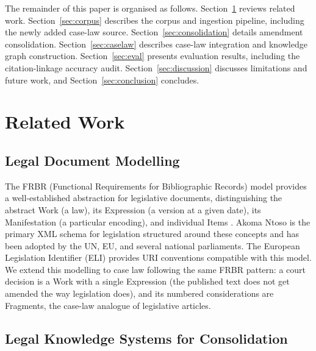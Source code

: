\documentclass{IOS-Book-Article}
\begin{document}
The remainder of this paper is organised as follows. Section~\ref{sec:related} reviews related work.
Section~\ref{sec:corpus} describes the corpus and ingestion pipeline, including the newly added case-law
source. Section~\ref{sec:consolidation} details amendment consolidation. Section~\ref{sec:caselaw} describes case-law integration
and knowledge graph construction. Section~\ref{sec:eval} presents evaluation results, including the
citation-linkage accuracy audit. Section~\ref{sec:discussion} discusses limitations and future work, and
Section~\ref{sec:conclusion} concludes.

\section{Related Work}
\label{sec:related}

\subsection{Legal Document Modelling}

The FRBR (Functional Requirements for Bibliographic Records) model provides a
well-established abstraction for legislative documents, distinguishing the abstract Work
(a law), its Expression (a version at a given date), its Manifestation (a particular
encoding), and individual Items \cite{ifla1998}. Akoma Ntoso \cite{palmirani2011a} is
the primary XML schema for legislation structured around these concepts and has been adopted
by the UN, EU, and several national parliaments. The European Legislation Identifier (ELI)
\cite{pubsoffice2012} provides URI conventions compatible with this model. We extend
this modelling to case law following the same FRBR pattern: a court decision is a Work with
a single Expression (the published text does not get amended the way legislation does), and
its numbered considerations are Fragments, the case-law analogue of legislative articles.

\subsection{Legal Knowledge Systems for Consolidation}
\end{document}
